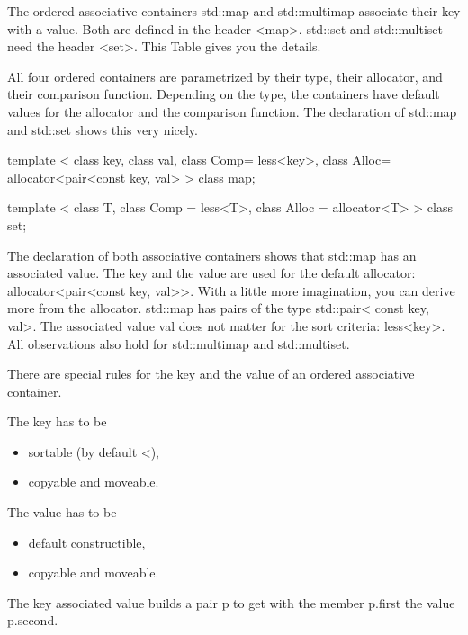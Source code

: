 


The ordered associative containers std::map and std::multimap associate their key with a value. Both are defined in the header <map>. std::set and std::multiset need the header <set>. This Table gives you the details.

All four ordered containers are parametrized by their type, their allocator, and their comparison function. Depending on the type, the containers have default values for the allocator and the comparison function. The declaration of std::map and std::set shows this very nicely.


\begin{cpp}
template < class key, class val, class Comp= less<key>,
		   class Alloc= allocator<pair<const key, val> >
class map;

template < class T, class Comp = less<T>,
		   class Alloc = allocator<T> >
class set;
\end{cpp}


The declaration of both associative containers shows that std::map has an associated value. The key and the value are used for the default allocator: allocator<pair<const key, val>{}>. With a little more imagination, you can derive more from the allocator. std::map has pairs of the type std::pair< const key, val>. The associated value val does not matter for the sort criteria: less<key>. All observations also hold for std::multimap and std::multiset.


There are special rules for the key and the value of an ordered associative container.

The key has to be

\begin{itemize}
\item 
sortable (by default <),

\item 
copyable and moveable.
\end{itemize}

The value has to be

\begin{itemize}
\item 
default constructible,

\item 
copyable and moveable.
\end{itemize}

The key associated value builds a pair p to get with the member p.first the value p.second.

